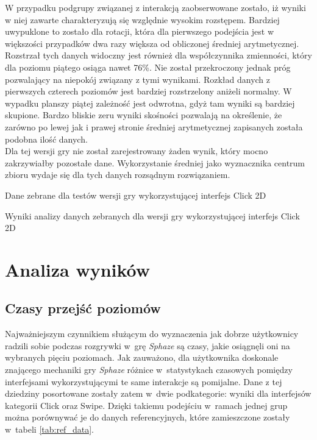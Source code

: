 \documentclass[a4paper,12pt,numbers=noenddot]{report}
\begin{document}
W przypadku podgrupy związanej z interakcją zaobserwowane zostało, iż wyniki w niej zawarte charakteryzują się względnie wysokim rozstępem. Bardziej uwypuklone to zostało dla rotacji, która dla pierwszego podejścia jest w większości przypadków dwa razy większa od obliczonej średniej arytmetycznej. Rozstrzał tych danych widoczny jest również dla współczynnika zmienności, który dla poziomu piątego osiąga nawet 76\%. Nie został przekroczony jednak próg pozwalający na niepokój związany z tymi wynikami. Rozkład danych z pierwszych czterech poziomów jest bardziej rozstrzelony aniżeli normalny. W wypadku planszy piątej zależność jest odwrotna, gdyż tam wyniki są bardziej skupione. Bardzo bliskie zeru wyniki skośności pozwalają na określenie, że zarówno po lewej jak i prawej stronie średniej arytmetycznej zapisanych została podobna ilość danych.\\

Dla tej wersji gry nie został zarejestrowany żaden wynik, który mocno zakrzywiałby pozostałe dane. Wykorzystanie średniej jako wyznacznika centrum zbioru wydaje się dla tych danych rozsądnym rozwiązaniem.



\begin{table}
  \caption{Dane zebrane dla testów wersji gry wykorzystującej interfejs Click 2D}
  \resizebox{\textwidth}{!}{%
	
  }
  \label{tab:results_Click2d}%
  \caption{Wyniki analizy danych zebranych dla wersji gry wykorzystującej interfejs Click 2D}
  \resizebox{\textwidth}{!}{%
	
  }
  \label{tab:analysis_Click2d}%
\end{table}%

\section{Analiza wyników}
\subsection{Czasy przejść poziomów}
Najważniejszym czynnikiem służącym do wyznaczenia jak dobrze użytkownicy radzili sobie podczas rozgrywki w~grę \textit{Sphaze} są czasy, jakie osiągnęli oni na wybranych pięciu poziomach. Jak zauważono, dla użytkownika doskonale znającego mechaniki gry \textit{Sphaze} różnice w~statystykach czasowych pomiędzy interfejsami wykorzystującymi te same interakcje są pomijalne. Dane z tej dziedziny posortowane zostały zatem w~dwie podkategorie: wyniki dla interfejsów kategorii Click oraz Swipe. Dzięki takiemu podejściu w~ramach jednej grup można porównywać je do danych referencyjnych, które zamieszczone zostały w~tabeli \ref{tab:ref_data}. 
\end{document}
